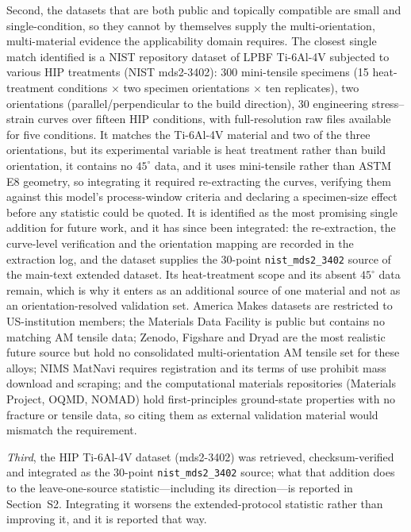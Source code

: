 \documentclass[11pt,a4paper,twocolumn]{article}
\providecommand{\ang}[1]{\ensuremath{#1^{\circ}}}
\begin{document}
Second, the datasets that are both public and topically compatible are small and single-condition, so they
cannot by themselves supply the multi-orientation, multi-material evidence the applicability domain
requires. The closest single match identified is a NIST repository dataset of LPBF Ti-6Al-4V subjected to
various HIP treatments (NIST mds2-3402): 300 mini-tensile specimens (15 heat-treatment conditions $\times$ two specimen orientations $\times$ ten replicates), two orientations
(parallel/perpendicular to the build direction), 30 engineering stress--strain curves over fifteen HIP
conditions, with full-resolution raw files available for five conditions. It matches the Ti-6Al-4V
material and two of the three orientations, but its experimental variable is heat treatment rather than
build orientation, it contains no $\ang{45}$ data, and it uses mini-tensile rather than ASTM E8 geometry,
so integrating it required re-extracting the curves, verifying them against this model's
process-window criteria and declaring a specimen-size effect before any statistic could be quoted. It is
identified as the most promising single addition for future work, and it has since been integrated: the re-extraction, the curve-level verification and the orientation mapping are recorded in the extraction log, and the dataset supplies the 30-point \texttt{nist\_mds2\_3402} source of the main-text extended dataset. Its heat-treatment scope and its absent $\ang{45}$ data remain, which is why it enters as an additional source of one material and not as an orientation-resolved validation set. America
Makes datasets are restricted to US-institution members; the Materials Data Facility is public but
contains no matching AM tensile data; Zenodo, Figshare and Dryad are the most realistic future source but
hold no consolidated multi-orientation AM tensile set for these alloys; NIMS MatNavi requires registration
and its terms of use prohibit mass download and scraping; and the computational materials repositories
(Materials Project, OQMD, NOMAD) hold first-principles ground-state properties with no fracture or tensile
data, so citing them as external validation material would mismatch the requirement.

\emph{Third}, the HIP Ti-6Al-4V dataset (mds2-3402) was retrieved, checksum-verified and integrated as the 30-point \texttt{nist\_mds2\_3402} source; what that addition does to the leave-one-source statistic---including its direction---is reported in Section~S2. Integrating it worsens the extended-protocol statistic rather than improving it, and it is reported that way.
\end{document}
